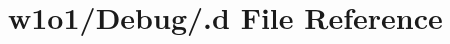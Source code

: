 \hypertarget{w1o1_2_debug_2_8d}{}\section{w1o1/\+Debug/.d File Reference}
\label{w1o1_2_debug_2_8d}

